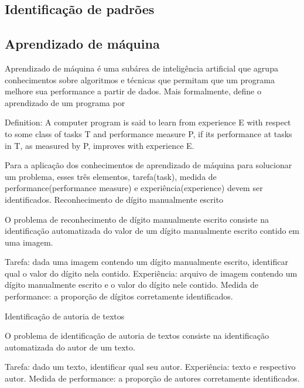 \subsection{Identificação de padrões}
\subsection{Aprendizado de máquina}
Aprendizado de máquina é uma subárea de inteligência artificial que agrupa conhecimentos sobre algoritmos e técnicas que permitam que um programa melhore sua performance a partir de dados. Mais formalmente, \cite{Tom_mitchell} define o aprendizado de um programa por

Definition: A computer program is said to learn from experience E with respect to some class of tasks T and performance measure P, if its performance at tasks in T, as measured by P, improves with experience E. 

Para a aplicação dos conhecimentos de aprendizado de máquina para solucionar um problema, esses três elementos, tarefa(task), medida de performance(performance measure) e experiência(experience) devem ser identificados.
Reconhecimento de dígito manualmente escrito

O problema de reconhecimento de dígito manualmente escrito consiste na identificação automatizada do valor de um dígito manualmente escrito contido em uma imagem.

Tarefa: dada uma imagem contendo um dígito manualmente escrito, identificar qual o valor do dígito nela contido.
Experiência: arquivo de imagem contendo um dígito manualmente escrito e o valor do dígito nele contido.
Medida de performance: a proporção de dígitos corretamente identificados. 

Identificação de autoria de textos

O problema de identificação de autoria de textos consiste na identificação automatizada do autor de um texto.

Tarefa: dado um texto, identificar qual seu autor.
Experiência: texto e respectivo autor.
Medida de performance: a proporção de autores corretamente identificados.



\cite{ML_debt} \cite{ML_know}

